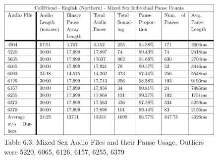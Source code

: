 \afterpage{\clearpage}
\begin{figure}[h]
	\begin{center}
		\includegraphics[scale=0.35]{src/main-matter/results/experiment-sex/pause-analysis/mixed-pause-table}
		\caption{Table 6.3: Mixed Sex Audio Files and their Pause Usage, Outliers were 5220, 6065, 6126, 6157, 6255, 6379}
		\label{female-10bins}
	\end{center}
\end{figure}









